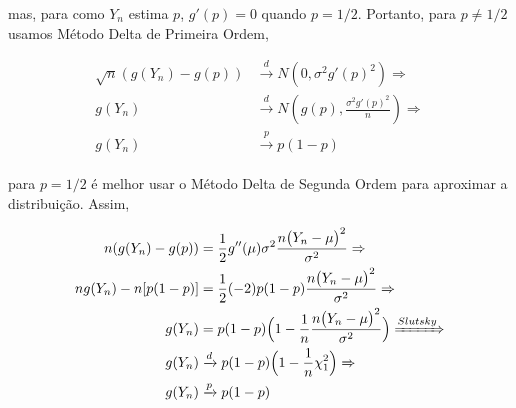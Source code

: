 \documentclass[11pt]{article}
\newenvironment{qparts}{\begin{enumerate}[{(}a{)}]}{\end{enumerate}}
\begin{document}
\begin{qparts}
mas, para como $Y_n$ estima $p$, $g'(p) = 0$ quando $p = 1/2$. Portanto,
para $p\neq1/2$ usamos Método Delta de Primeira Ordem,

\begin{subequations}
	\begin{align}
		\sqrt{n}(g(Y_n) - g(p)) &\xrightarrow[]{d} N(0, \sigma^2 g'(p)^2)   \Rightarrow \\
		g(Y_n) &\xrightarrow[]{d} N(g(p), \frac{\sigma^2 g'(p)^2}{n}) \label{equation:binomialdelta1}
		\Rightarrow \\
		g(Y_n) &\xrightarrow[]{p} p(1-p)
	\end{align}
\end{subequations}



 para $p=1/2$ é melhor usar o Método Delta de Segunda Ordem para aproximar a distribuição. Assim, 

\begin{subequations}
\begin{align}
	n(g(Y_n) - g(p)) &= \frac{1}{2}g''(\mu)\sigma^2\frac{n\big( Y_n-\mu\big)^2}{\sigma^2} \Rightarrow \\
	ng(Y_n) - n[p(1-p)] &= \frac{1}{2} (-2) p(1-p) \frac{n\big( Y_n-\mu\big)^2}{\sigma^2} \Rightarrow \\
	g(Y_n) &= p(1-p)\Big(1 -\frac{1}{n}\frac{n\big( Y_n-\mu\big)^2}{\sigma^2}\Big)
	\xRightarrow{Slutsky}\\
	g(Y_n) &\xrightarrow[]{d} p(1-p)\Big(1 -\frac{1}{n}\chi_1^2\Big) \label{equation:binomialdelta2}
	\xRightarrow{}\\
	g(Y_n) &\xrightarrow[]{p} p(1-p)
	\end{align}
\end{subequations}


\end{qparts}

\end{document}
